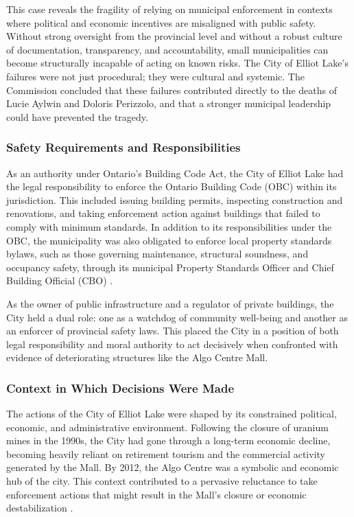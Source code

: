 \documentclass[12pt]{article}
\begin{document}
This case reveals the fragility of relying on municipal enforcement in contexts where political and economic incentives are misaligned with public safety. Without strong oversight from the provincial level and without a robust culture of documentation, transparency, and accountability, small municipalities can become structurally incapable of acting on known risks. The City of Elliot Lake's failures were not just procedural; they were cultural and systemic. The Commission concluded that these failures contributed directly to the deaths of Lucie Aylwin and Doloris Perizzolo, and that a stronger municipal leadership could have prevented the tragedy.

\subsubsection*{Safety Requirements and Responsibilities}

As an authority under Ontario's Building Code Act, the City of Elliot Lake had the legal responsibility to enforce the Ontario Building Code (OBC) within its jurisdiction. This included issuing building permits, inspecting construction and renovations, and taking enforcement action against buildings that failed to comply with minimum standards. In addition to its responsibilities under the OBC, the municipality was also obligated to enforce local property standards bylaws, such as those governing maintenance, structural soundness, and occupancy safety, through its municipal Property Standards Officer and Chief Building Official (CBO) \cite[p380-381]{AlgoLakeReport1}.

As the owner of public infrastructure and a regulator of private buildings, the City held a dual role: one as a watchdog of community well-being and another as an enforcer of provincial safety laws. This placed the City in a position of both legal responsibility and moral authority to act decisively when confronted with evidence of deteriorating structures like the Algo Centre Mall.

\subsubsection*{Context in Which Decisions Were Made}

The actions of the City of Elliot Lake were shaped by its constrained political, economic, and administrative environment. Following the closure of uranium mines in the 1990s, the City had gone through a long-term economic decline, becoming heavily reliant on retirement tourism and the commercial activity generated by the Mall. By 2012, the Algo Centre was a symbolic and economic hub of the city. This context contributed to a pervasive reluctance to take enforcement actions that might result in the Mall's closure or economic destabilization \cite[p6-7, p380-381]{AlgoLakeReport1}.
\end{document}
